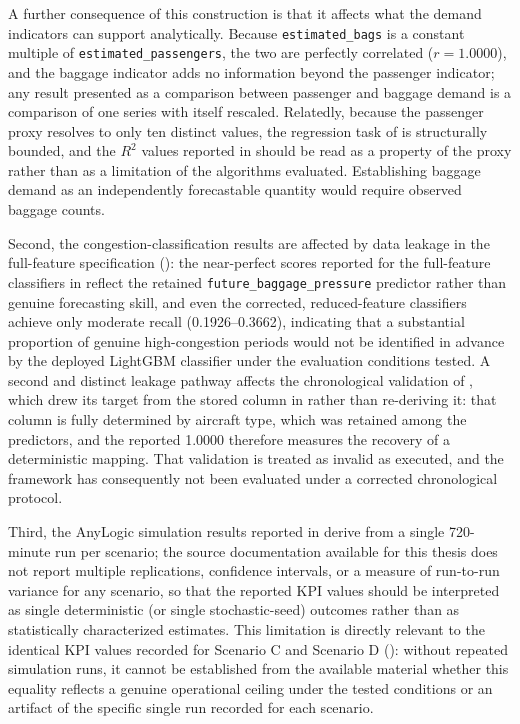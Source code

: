 A further consequence of this construction is that it affects what the demand indicators can support analytically. Because \nolinkurl{estimated_bags} is a constant multiple of \nolinkurl{estimated_passengers}, the two are perfectly correlated ($r = 1.0000$), and the baggage indicator adds no information beyond the passenger indicator; any result presented as a comparison between passenger and baggage demand is a comparison of one series with itself rescaled. Relatedly, because the passenger proxy resolves to only ten distinct values, the regression task of  is structurally bounded, and the $R^2$ values reported in  should be read as a property of the proxy rather than as a limitation of the algorithms evaluated. Establishing baggage demand as an independently forecastable quantity would require observed baggage counts.

Second, the congestion-classification results are affected by data leakage in the full-feature specification (): the near-perfect scores reported for the full-feature classifiers in  reflect the retained \nolinkurl{future_baggage_pressure} predictor rather than genuine forecasting skill, and even the corrected, reduced-feature classifiers achieve only moderate recall (0.1926--0.3662), indicating that a substantial proportion of genuine high-congestion periods would not be identified in advance by the deployed LightGBM classifier under the evaluation conditions tested. A second and distinct leakage pathway affects the chronological validation of , which drew its target from the stored column in  rather than re-deriving it: that column is fully determined by aircraft type, which was retained among the predictors, and the reported 1.0000 therefore measures the recovery of a deterministic mapping. That validation is treated as invalid as executed, and the framework has consequently not been evaluated under a corrected chronological protocol.

Third, the AnyLogic simulation results reported in  derive from a single 720-minute run per scenario; the source documentation available for this thesis does not report multiple replications, confidence intervals, or a measure of run-to-run variance for any scenario, so that the reported KPI values should be interpreted as single deterministic (or single stochastic-seed) outcomes rather than as statistically characterized estimates. This limitation is directly relevant to the identical KPI values recorded for Scenario C and Scenario D (): without repeated simulation runs, it cannot be established from the available material whether this equality reflects a genuine operational ceiling under the tested conditions or an artifact of the specific single run recorded for each scenario.

